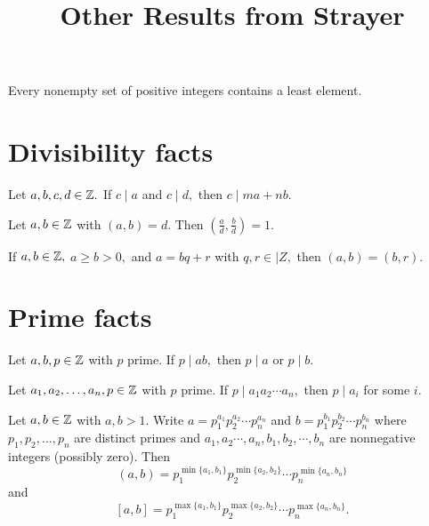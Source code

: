 \documentclass[letterpaper, 11 pt]{ximera}
\title{Other Results from Strayer}
\begin{document}
\begin{abstract}
\end{abstract}

\maketitle

\begin{axiom}\label{well-order}
    Every nonempty set of positive integers contains a least element.
\end{axiom}
    \section*{Divisibility facts}\label{sec:additional-div}

    \begin{lem*}[Proposition 1.2]\label{lem:linear-combo}
         Let $a,b,c,d\in\mathbb Z.$ If $c\mid a$ and $c\mid d,$ then $c\mid ma+nb.$
    \end{lem*}


    \begin{prop*}[Proposition 1.10]\label{prop:div-gcd-rel-prime}
        Let $a,b\in\mathbb Z$ with $(a,b)=d.$ Then $(\tfrac{a}{d},\tfrac{b}{d})=1.$
    \end{prop*}


    \begin{lem*}[Lemma 1.12]\label{lem:gcd-remainders}
     If $a,b\in\mathbb Z,$ $a\geq b\gt 0,$ and $a=bq+r$ with $q,r\in|Z,$ then $(a,b)=(b,r).$
    \end{lem*}
    

\section*{Prime facts}\label{sec:additional-primes}

\begin{lem*}[Lemma 1.14]\label{lem:irreducible-prime}
    Let $a,b,p\in\mathbb Z$ with $p$ prime. If $p\mid ab,$ then $p\mid a$ or $p\mid b.$
\end{lem*}

\begin{cor*}[Corollary 1.15]\label{cor:irreducible-prime} Let $a_1,a_2,\dots,a_n,p\in\mathbb Z$ with $p$ prime. If $p\mid a_1a_2\cdots a_n,$ then $p\mid a_i$ for some $i.$
\end{cor*}

\begin{prop*}[Proposition 1.17]\label{prop:form-lcm-gcd}
 Let $a,b\in\mathbb Z$ with $a,b\gt 1.$ Write $a=p_1^{a_1}p_2^{a_2}\cdots  p_n^{a_n}$ and $b=p_1^{b_1}p_2^{b_2}\cdots p_n^{b_n}$ where $p_1,p_2,\dots,p_n$ are distinct primes and ${a_1},{a_2}\cdots,{a_n},{b_1},{b_2},\cdots,{b_n}$ are nonnegative integers (possibly zero). Then
        \[(a,b)=p_1^{\min\{a_1,b_1\}}p_2^{\min\{a_2,b_2\}}\cdots p_n^{\min\{a_n,b_n\}}\]
        and 
        \[[a,b]=p_1^{\max\{a_1,b_1\}}p_2^{\max\{a_2,b_2\}}\cdots p_n^{\max\{a_n,b_n\}}.\]
\end{prop*}
\end{document}
